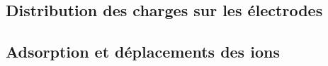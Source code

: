     \subsection{Distribution des charges sur les électrodes}
    \subsection{Adsorption et déplacements des ions}
